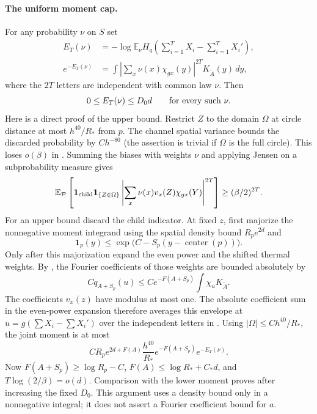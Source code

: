 \paragraph{The uniform moment cap.}
For any probability $\nu$ on $S$ set
\begin{equation}\label{eq:thermal-moment-cost}
 \begin{split}
 E_T(\nu)&=-\log\mathbb E_\nu
 H_q\left(\sum_{i=1}^TX_i-\sum_{i=1}^TX_i'\right),\\
 e^{-E_T(\nu)}&=
 \int\left|\sum_x\nu(x)\chi_{gx}(y)\right|^{2T}K_{\widetilde A}(y)\,dy,
 \end{split}
\end{equation}
where the $2T$ letters are independent with common law $\nu$.  Then
\begin{equation}\label{eq:thermal-moment-cap}
 0\le E_T(\nu)\le D_0d\qquad\hbox{for every such }\nu.
\end{equation}
Here is a direct proof of the upper bound.  Restrict $Z$ to the domain
$\Omega$ at circle distance at most $h^{40}/R_*$ from $p$.  The channel
spatial variance bounds the discarded probability by $Ch^{-80}$
(the assertion is trivial if $\Omega$ is the full circle).
This loses $o(\beta)$ in .  Summing the biases with
weights $\nu$ and applying Jensen on a subprobability measure gives
\[
 \mathbb E_{\mathcal P}
 \left[\mathbf1_{\rm child}\mathbf1_{\{Z\in\Omega\}}
 \left|\sum_x\nu(x)v_x(Z)\chi_{gx}(Y)\right|^{2T}\right]
 \ge(\beta/2)^{2T}.
\]
For an upper bound discard the child indicator.  At fixed $z$, first
majorize the nonnegative moment integrand using the spatial density
bound $R_pe^{2d}$ and
\[
 \mathbf1_p(y)\le
 \exp\bigl(C-S_p(y-\operatorname{center}(p))\bigr).
\]
Only after this majorization expand the even power and the shifted
thermal weights.  By , the Fourier
coefficients of those weights are bounded absolutely by
\[
 Cq_{A+S_p}(u)\le
 Ce^{-F(A+S_p)}\int\chi_u K_{\widetilde A}.
\]
The coefficients $v_x(z)$ have modulus at most one.  The absolute
coefficient sum in the even-power expansion therefore averages this
envelope at $u=g(\sum X_i-\sum X_i')$ over the independent letters in
.  Using $|\Omega|\le Ch^{40}/R_*$, the
joint moment is at most
\[
 C R_p e^{2d+F(A)}\frac{h^{40}}{R_*}
       e^{-F(A+S_p)}e^{-E_T(\nu)}.
\]
Now $F(A+S_p)\ge\log R_p-C$,
$F(A)\le\log R_*+C_*d$, and
$T\log(2/\beta)=o(d)$.  Comparison with the lower moment proves
 after increasing the fixed $D_0$.
This argument uses a density bound only in a nonnegative integral; it
does not assert a Fourier coefficient bound for $a$.

